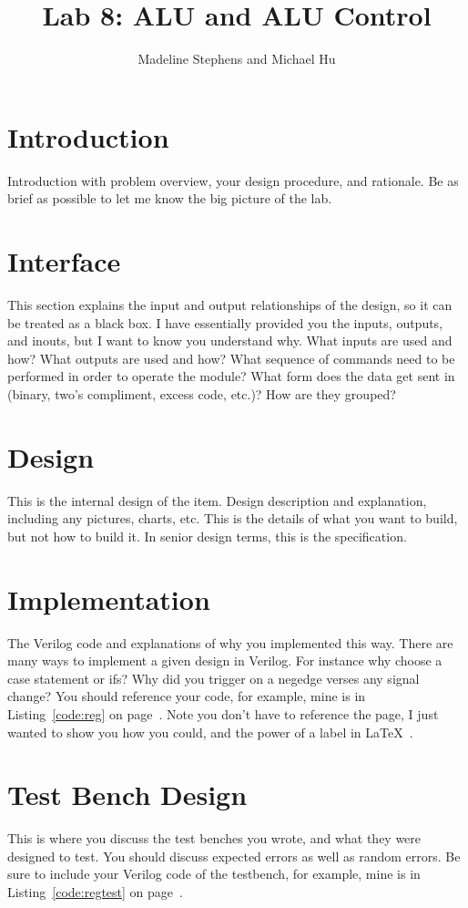 \documentclass{article}
\author{Madeline Stephens and Michael Hu}
\title{Lab 8: ALU and ALU Control}
\newcommand{\Verilog}[3]{
  \lstset{language=Verilog}
  \lstset{backgroundcolor=\color{listinggray},rulecolor=\color{blue}}
  \lstset{linewidth=\textwidth}
  \lstset{commentstyle=\textit, stringstyle=\upshape,showspaces=false}
  \lstset{frame=tb}
  
}
\begin{document}
\maketitle

\section{Introduction}


Introduction with problem overview, your design procedure, and rationale.  Be as brief as possible to let me know the big picture of the lab.

\section{Interface}
This section explains the input and output relationships of the design, so it can be treated as a black box.  I have essentially provided you the inputs, outputs, and inouts, but I want to know you understand why.  What inputs are used and how?  What outputs are used and how?  What sequence of commands need to be performed in order to operate the module?  What form does the data get sent in (binary, two's compliment, excess code, etc.)?  How are they grouped?

\section{Design}
This is the internal design of the item.  Design description and explanation, including any pictures, charts, etc.  This is the details of what you want to build, but not how to build it.  In senior design terms, this is the specification.

\section{Implementation}
The Verilog code and explanations of why you implemented this way.  There are many ways to implement a given design in Verilog.  For instance why choose a case statement or ifs?  Why did you trigger on a negedge verses any signal change?  You should reference your code, for example, mine is in Listing~\ref{code:reg} on page~\pageref{code:reg}.  Note you don't have to reference the page, I just wanted to show you how you could, and the power of a label in \LaTeX\ .

\Verilog{Verilog code for implementing a register.}{code:reg}{../code/register.v}

\section{Test Bench Design}
This is where you discuss the test benches you wrote, and what they were designed to test.  You should discuss expected errors as well as random errors.  Be sure to include your Verilog code of the testbench, for example, mine is in Listing~\ref{code:regtest} on page~\pageref{code:regtest}.
\end{document}

